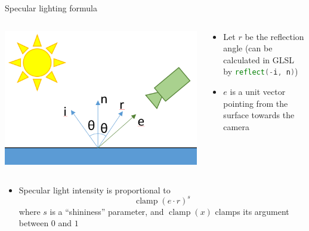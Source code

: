\begin{frame}{Specular lighting formula}
	\begin{columns}
		\begin{column}{0.33\textwidth}
			\includegraphics[width=\textwidth]{specular_angle}
		\end{column}
		\begin{column}{0.65\textwidth}
			\begin{itemize}
				\pause\item Let $r$ be the reflection angle (can be calculated in GLSL by \lstinline[language=GLSL]{reflect(-i, n)})
				\pause\item $e$ is a unit vector pointing from the surface towards the camera
			\end{itemize}
		\end{column}
	\end{columns}
	\begin{itemize}
		\pause\item Specular light intensity is proportional to
		$$ \operatorname{clamp}(e \cdot r)^s $$
		where $s$ is a ``shininess'' parameter, and $\operatorname{clamp}(x)$ clamps its argument between $0$ and $1$
	\end{itemize}
\end{frame}

